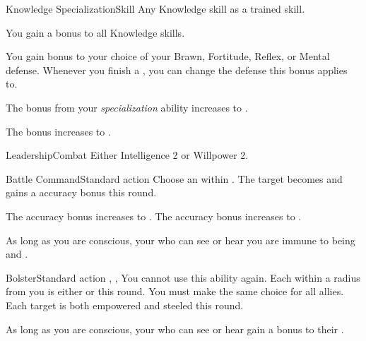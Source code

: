   \begin{feat}{Knowledge Specialization}{Skill}
    \featpre Any Knowledge skill as a trained skill.

     You gain a  bonus to all Knowledge skills.

     You gain  bonus to your choice of your Brawn, Fortitude, Reflex, or Mental defense.
    Whenever you finish a , you can change the defense this bonus applies to.

     The bonus from your \textit{specialization} ability increases to .

     The bonus increases to .
  \end{feat}

  \begin{feat}{Leadership}{Combat}
    \featpre Either Intelligence 2 or Willpower 2.

    \begin{activeability}{Battle Command}{Standard action}
      \abilitytags \atAuditory
      \rankline
      Choose an  within \medrange.
      The target becomes \focused and gains a  accuracy bonus this round.

      \rankline
       The accuracy bonus increases to .
       The accuracy bonus increases to .
    \end{activeability}

     As long as you are conscious, your  who can see or hear you are immune to being \frightened and \panicked.

    \begin{activeability}{Bolster}{Standard action}
      \abilitytags \atAuditory, , 
      \abilitycost You  cannot use this ability again.
      \rankline
      Each  within a \largearea radius from you is either \empowered or \steeled this round.
      You must make the same choice for all allies. 
      \rankline
       Each target is both empowered and steeled this round.
    \end{activeability}

     As long as you are conscious, your  who can see or hear gain a  bonus to their .
  \end{feat}

